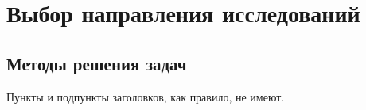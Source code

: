 \titleformat{\section}[block]{\large\bfseries}{\thesection}{0.5em}{}
\titlespacing{\section}{12.5mm}{10pt}{10pt}
\let\oldsubsection\subsection

\section{Выбор направления исследований}

\subsection{Методы решения задач}

Пункты и подпункты заголовков, как правило, не имеют.

\subsubsection{}

\paragraph{}
